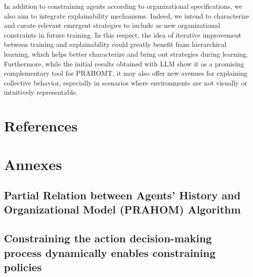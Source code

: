 \documentclass[runningheads]{llncs}
\theoremstyle{freethm}
\theoremstyle{proofoutline}
\newcounter{proof}
\begin{document}
In addition to constraining agents according to organizational specifications, we also aim to integrate explainability mechanisms. Indeed, we intend to characterize and curate relevant emergent strategies to include as new organizational constraints in future training. In this respect, the idea of iterative improvement between training and explainability could greatly benefit from hierarchical learning, which helps better characterize and bring out strategies during learning. Furthermore, while the initial results obtained with LLM show it as a promising complementary tool for PRAHOMT, it may also offer new avenues for explaining collective behavior, especially in scenarios where environments are not visually or intuitively representable.


\section*{References}





\newpage

\section*{Annexes}

\subsection*{Partial Relation between Agents' History and Organizational Model (PRAHOM) Algorithm}


\subsection*{Constraining the action decision-making process dynamically enables constraining policies}

\end{document}
